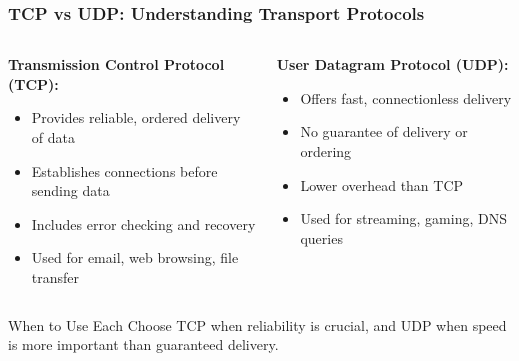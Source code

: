 \documentclass{beamer}
\begin{document}
\begin{frame}
    \frametitle{TCP vs UDP: Understanding Transport Protocols}
    
    \begin{columns}[t]
        \begin{column}{0.5\textwidth}
            \textbf{Transmission Control Protocol (TCP):}
            \begin{itemize}
                \item Provides reliable, ordered delivery of data
                \item Establishes connections before sending data
                \item Includes error checking and recovery
                \item Used for email, web browsing, file transfer
            \end{itemize}
        \end{column}
        
        \begin{column}{0.5\textwidth}
            \textbf{User Datagram Protocol (UDP):}
            \begin{itemize}
                \item Offers fast, connectionless delivery
                \item No guarantee of delivery or ordering
                \item Lower overhead than TCP
                \item Used for streaming, gaming, DNS queries
            \end{itemize}
        \end{column}
    \end{columns}
    
    \begin{block}{When to Use Each}
        Choose TCP when reliability is crucial, and UDP when speed is more important than guaranteed delivery.
    \end{block}
\end{frame}
\end{document}
